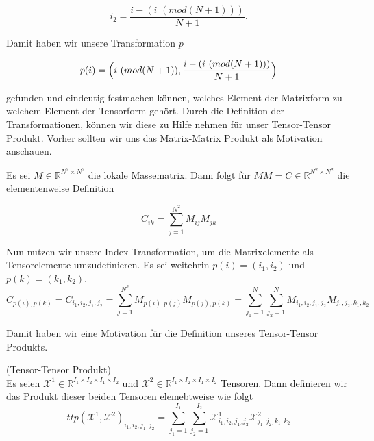 \begin{equation} \label{eq:tupel3}
 i_2 = \dfrac{ i -  (i \, \, (mod (N+1))) } {N+1}.
\end{equation}

Damit haben wir unsere Transformation $p$

\begin{equation} \label{eq:p}
p(i)= \Big{(} i \, \, (mod (N+1)),  \dfrac{ i -  (i \, \, (mod (N+1))) } {N+1} \Big{)}
\end{equation}

gefunden und eindeutig festmachen können, welches Element der Matrixform zu welchem Element der Tensorform gehört.
Durch die Definition der Transformationen, können wir diese zu Hilfe nehmen für unser Tensor-Tensor Produkt. Vorher sollten wir uns das Matrix-Matrix Produkt als Motivation anschauen.

Es sei $M \in \mathbb{R}^{N^2 \times N^2}$ die lokale Massematrix. Dann folgt für $MM=C \in \mathbb{R}^{N^2 \times N^2}$ die elementenweise Definition

\begin{equation}
C_{ik}=\sum_{j=1}^{N^2} M_{ij} M_{jk}
\end{equation}

Nun nutzen wir unsere Index-Transformation, um die Matrixelemente als Tensorelemente umzudefinieren. Es sei weitehrin $p(i)=(i_1,i_2)$ und $p(k)=(k_1,k_2)$.
\begin{equation}
C_{p(i),p(k)} = C_{i_1,i_2,j_1,j_2} =  \sum_{j=1}^{N^2} M_{p(i),p(j)} M_{p(j),p(k)} = \sum_{j_1=1}^N \sum_{j_2=1}^N M_{i_1,i_2,j_1,j_2} M_{j_1,j_2,k_1,k_2} 
\end{equation}

Damit haben wir eine Motivation für die Definition unseres Tensor-Tensor Produkts.
\begin{Definition} (Tensor-Tensor Produkt) \\
Es seien $\pmb{\mathscr{X}}^1  \in \mathbb{R}^{I_1 \times I_2 \times I_1 \times I_2}$ und $\pmb{\mathscr{X}}^2 \in \mathbb{R}^{I_1 \times I_2 \times I_1 \times I_2}$ Tensoren.
Dann definieren wir das Produkt dieser beiden Tensoren elemebtweise wie folgt
\begin{equation}
ttp(\pmb{\mathscr{X}}^1,\pmb{\mathscr{X}}^2)_{i_1,i_2,j_1,j_2}= \sum_{j_1=1}^{I_1} \sum_{j_2=1}^{I_2} \pmb{\mathscr{X}}^1_{i_1,i_2,j_1,j_2} \pmb{\mathscr{X}}^2_{j_1,j_2,k_1,k_2} 
\end{equation}
\end{Definition}

